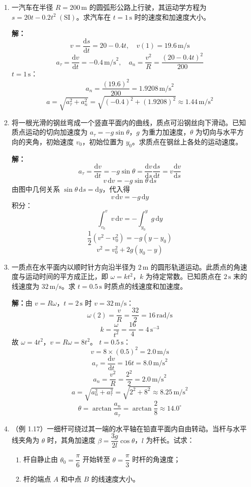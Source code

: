 \documentclass{ctexart}
\begin{document}
\begin{enumerate}
\item 一汽车在半径 $R = 200\,\text{m}$ 的圆弧形公路上行驶，其运动学方程为 $s = 20t - 0.2t^{2}\;(\text{SI})$。求汽车在 $t = 1\,\text{s}$ 时的速度和加速度大小。

\textbf{解：}
\[
v = \frac{\mathrm{d}s}{\mathrm{d}t} = 20 - 0.4t,\quad v(1) = 19.6\,\text{m/s}
\]
\[
a_{\tau} = \frac{\mathrm{d}v}{\mathrm{d}t} = -0.4\,\text{m/s}^{2},\quad
a_n = \frac{v^{2}}{R} = \frac{(20 - 0.4t)^{2}}{200}
\]
$t = 1\,\text{s}$：
\[
a_n = \frac{(19.6)^{2}}{200} = 1.9208\,\text{m/s}^{2}
\]
\[
a = \sqrt{a_{\tau}^{2} + a_n^{2}} = \sqrt{(-0.4)^{2} + (1.9208)^{2}} \approx 1.44\,\text{m/s}^{2}
\]

\item 将一根光滑的钢丝弯成一个竖直平面内的曲线，质点可沿钢丝向下滑动。已知质点运动的切向加速度为 $a_{\tau} = -g\sin\theta$，$g$ 为重力加速度，$\theta$ 为切向与水平方向的夹角，初始速度 $v_0$，初始位置为 $y_0$。求质点在钢丝上各处的运动速度。

\textbf{解：}
\[
a_{\tau} = \frac{\mathrm{d}v}{\mathrm{d}t} = -g\sin\theta = \frac{\mathrm{d}v}{\mathrm{d}s}\frac{\mathrm{d}s}{\mathrm{d}t} = v\frac{\mathrm{d}v}{\mathrm{d}s}
\]
\[
v\,\mathrm{d}v = -g\sin\theta\,\mathrm{d}s
\]
由图中几何关系 $\sin\theta\,\mathrm{d}s = \mathrm{d}y$，代入得
\[
v\,\mathrm{d}v = -g\,\mathrm{d}y
\]
积分：
\[
\int_{v_0}^{v} v\,\mathrm{d}v = -\int_{y_0}^{y} g\,\mathrm{d}y
\]
\[
\frac12(v^{2} - v_0^{2}) = -g(y - y_0)
\]
\[
v^{2} = v_0^{2} + 2g(y_0 - y)
\]

\item 一质点在水平面内以顺时针方向沿半径为 $2\,\text{m}$ 的圆形轨道运动。此质点的角速度与运动时间的平方成正比，即 $\omega = kt^{2}$，$k$ 为待定常数。已知质点在 $2\,\text{s}$ 末的线速度为 $32\,\text{m/s}$。求 $t = 0.5\,\text{s}$ 时质点的线速度和加速度。

\textbf{解：}由 $v = R\omega$，$t = 2\,\text{s}$ 时 $v = 32\,\text{m/s}$：
\[
\omega(2) = \frac{v}{R} = \frac{32}{2} = 16\,\text{rad/s}
\]
\[
k = \frac{\omega}{t^{2}} = \frac{16}{4} = 4\,\text{s}^{-3}
\]
故 $\omega = 4t^{2}$，$v = R\omega = 8t^{2}$。
$t = 0.5\,\text{s}$：
\[
v = 8 \times (0.5)^{2} = 2.0\,\text{m/s}
\]
\[
a_{\tau} = \frac{\mathrm{d}v}{\mathrm{d}t} = 16t = 8.0\,\text{m/s}^{2}
\]
\[
a_n = \frac{v^{2}}{R} = \frac{2^{2}}{2} = 2.0\,\text{m/s}^{2}
\]
\[
a = \sqrt{a_n^{2} + a_{\tau}^{2}} = \sqrt{2^{2} + 8^{2}} \approx 8.25\,\text{m/s}^{2}
\]
\[
\theta = \arctan\frac{a_n}{a_{\tau}} = \arctan\frac{2}{8} \approx 14.0^{\circ}
\]

\item（例 1.17）一细杆可绕过其一端的水平轴在铅直平面内自由转动。当杆与水平线夹角为 $\theta$ 时，其角加速度 $\beta = \dfrac{3g}{2l}\cos\theta$，$l$ 为杆长。试求：
\begin{enumerate}
  \item 杆自静止由 $\theta_0 = \dfrac{\pi}{6}$ 开始转至 $\theta = \dfrac{\pi}{3}$ 时杆的角速度；
  \item 杆的端点 $A$ 和中点 $B$ 的线速度大小。
\end{enumerate}


\end{enumerate}
\end{document}
